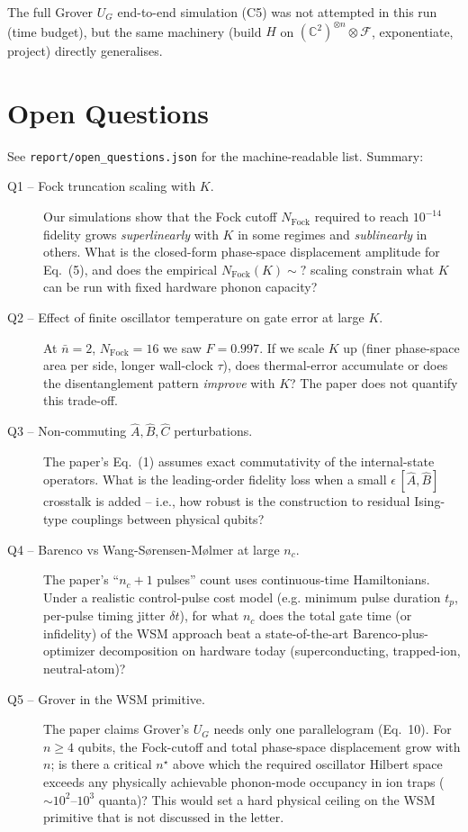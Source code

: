 \documentclass[11pt]{article}
\begin{document}
The full Grover $U_G$ end-to-end simulation (C5) was not attempted in this run
(time budget), but the same machinery (build $H$ on $(\mathbb C^2)^{\otimes n}
\otimes \mathcal F$, exponentiate, project) directly generalises.

\section{Open Questions}

See \verb|report/open_questions.json| for the machine-readable list. Summary:

\begin{description}
\item[Q1 -- Fock truncation scaling with $K$.] Our simulations show that the
      Fock cutoff $N_\mathrm{Fock}$ required to reach $10^{-14}$ fidelity grows
      \emph{superlinearly} with $K$ in some regimes and \emph{sublinearly} in
      others. What is the closed-form phase-space displacement amplitude for
      Eq.~(5), and does the empirical $N_\mathrm{Fock}(K) \sim ?$ scaling
      constrain what $K$ can be run with fixed hardware phonon capacity?

\item[Q2 -- Effect of finite oscillator temperature on gate error at large $K$.]
      At $\bar n = 2$, $N_\mathrm{Fock}=16$ we saw $F=0.997$. If we scale $K$
      up (finer phase-space area per side, longer wall-clock $\tau$), does
      thermal-error accumulate or does the disentanglement pattern
      \emph{improve} with $K$?  The paper does not quantify this trade-off.

\item[Q3 -- Non-commuting $\hat A, \hat B, \hat C$ perturbations.] The paper's
      Eq.~(1) assumes exact commutativity of the internal-state operators.
      What is the leading-order fidelity loss when a small $\epsilon\, [\hat
      A,\hat B]$ crosstalk is added -- i.e., how robust is the construction
      to residual Ising-type couplings between physical qubits?

\item[Q4 -- Barenco vs Wang-Sørensen-Mølmer at large $n_c$.] The paper's
      ``$n_c + 1$ pulses'' count uses continuous-time Hamiltonians. Under a
      realistic control-pulse cost model (e.g. minimum pulse duration $t_p$,
      per-pulse timing jitter $\delta t$), for what $n_c$ does the total gate
      time (or infidelity) of the WSM approach beat a state-of-the-art
      Barenco-plus-optimizer decomposition on hardware today
      (superconducting, trapped-ion, neutral-atom)?

\item[Q5 -- Grover in the WSM primitive.] The paper claims Grover's $U_G$
      needs only one parallelogram (Eq.~10). For $n\ge 4$ qubits, the
      Fock-cutoff and total phase-space displacement grow with $n$; is there
      a critical $n^\star$ above which the required oscillator Hilbert
      space exceeds any physically achievable phonon-mode occupancy in ion
      traps ($\sim 10^2$--$10^3$ quanta)?  This would set a hard physical
      ceiling on the WSM primitive that is not discussed in the letter.
\end{description}
\end{document}
